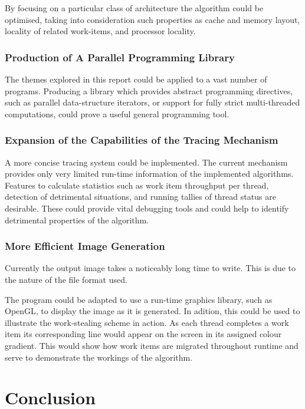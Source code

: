 By focusing on a particular class of architecture the algorithm could be optimised, taking into consideration such 
properties as cache and memory layout, locality of related work-items, and processor locality. 

\subsubsection*{Production of A Parallel Programming Library}
The themes explored in this report could be applied to a vast number of programs. 
Producing a library which provides abstract programming directives, such as parallel data-structure iterators, or
support for fully strict multi-threaded computations, could prove a useful general programming tool. 

\subsubsection*{Expansion of the Capabilities of the Tracing Mechanism}
A more concise tracing system could be implemented. The current mechanism provides only very limited run-time information
of the implemented algorithms. 
Features to calculate statistics such as work item throughput per thread, detection of detrimental situations, and running 
tallies of thread status are desirable. These could provide vital debugging tools and could help to identify detrimental 
properties of the algorithm.

\subsubsection*{More Efficient Image Generation}
Currently the output image takes a noticeably long time to write. This is due to the nature of the file format used.

The program could be adapted to use a run-time graphics library, such as OpenGL, to display the image as it is generated.
In adition, this could be used to illustrate the work-stealing scheme in action. As each thread completes a work item its corresponding
line would appear on the screen in its assigned colour gradient. This would show how work items are migrated throughout runtime and serve
to demonstrate the workings of the algorithm.

\section{Conclusion}

